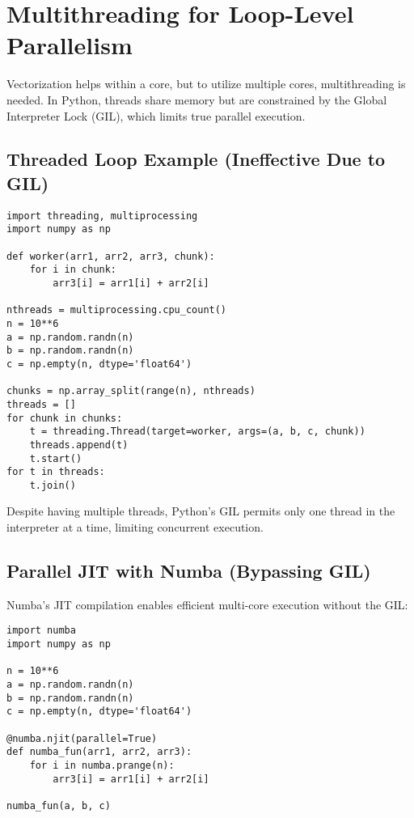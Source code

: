 \documentclass[11pt,a4paper]{book}
\begin{document}
\section{Multithreading for Loop-Level Parallelism}

Vectorization helps within a core, but to utilize multiple cores, multithreading is needed. In Python, threads share memory but are constrained by the Global Interpreter Lock (GIL), which limits true parallel execution.

\subsection{Threaded Loop Example (Ineffective Due to GIL)}

\begin{lstlisting}
import threading, multiprocessing
import numpy as np

def worker(arr1, arr2, arr3, chunk):
    for i in chunk:
        arr3[i] = arr1[i] + arr2[i]

nthreads = multiprocessing.cpu_count()
n = 10**6
a = np.random.randn(n)
b = np.random.randn(n)
c = np.empty(n, dtype='float64')

chunks = np.array_split(range(n), nthreads)
threads = []
for chunk in chunks:
    t = threading.Thread(target=worker, args=(a, b, c, chunk))
    threads.append(t)
    t.start()
for t in threads:
    t.join()
\end{lstlisting}

Despite having multiple threads, Python's GIL permits only one thread in the interpreter at a time, limiting concurrent execution.

\subsection{Parallel JIT with Numba (Bypassing GIL)}

Numba's JIT compilation enables efficient multi-core execution without the GIL:

\begin{lstlisting}
import numba
import numpy as np

n = 10**6
a = np.random.randn(n)
b = np.random.randn(n)
c = np.empty(n, dtype='float64')

@numba.njit(parallel=True)
def numba_fun(arr1, arr2, arr3):
    for i in numba.prange(n):
        arr3[i] = arr1[i] + arr2[i]

numba_fun(a, b, c)
\end{lstlisting}
\end{document}
